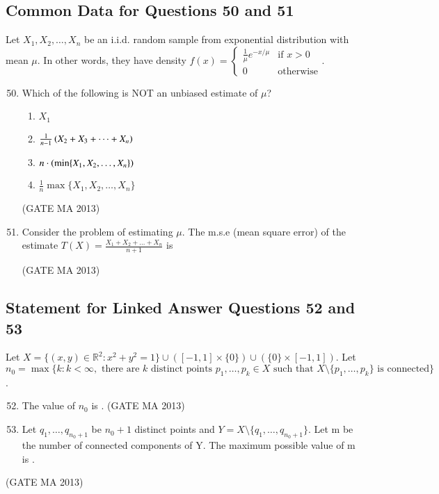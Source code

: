 \documentclass[journal,12pt,onecolumn]{IEEEtran}
\theoremstyle{remark}
\begin{document}
\subsection*{Common Data for Questions 50 and 51}
Let $X_1, X_2, \dots, X_n$ be an i.i.d. random sample from exponential distribution with mean $\mu$. In other words, they have density $f(x) = \begin{cases} \frac{1}{\mu} e^{-x/\mu} & \text{if } x>0 \\ 0 & \text{otherwise} \end{cases}$.
\begin{enumerate}
    \setcounter{enumi}{49}
    \item Which of the following is NOT an unbiased estimate of $\mu$?
    \begin{enumerate}
        \item $X_1$
        \item $\frac{1}{n-1}\left(X_2 + X_3 + \dots + X_n\right)$
        \item $n \cdot \left(\min\{X_1, X_2, \dots, X_n\}\right)$
        \item $\frac{1}{n} \max\{X_1, X_2, \dots, X_n\}$
    \end{enumerate}
    \hfill (GATE MA 2013)
    \item Consider the problem of estimating $\mu$. The m.s.e (mean square error) of the estimate $T(X) = \frac{X_1 + X_2 + \dots + X_n}{n+1}$ is
    \begin{enumerate}
    \end{enumerate}
    \hfill (GATE MA 2013)
\end{enumerate}
\subsection*{Statement for Linked Answer Questions 52 and 53}
Let $X = \{(x,y) \in \mathbb{R}^2 : x^2+y^2=1\} \cup ([-1,1] \times \{0\}) \cup (\{0\} \times [-1,1])$.
Let $n_0 = \max\{k : k < \infty, \text{ there are } k \text{ distinct points } p_1, \dots, p_k \in X \text{ such that } X \setminus \{p_1, \dots, p_k\} \text{ is connected}\}$.
\begin{enumerate}
    \setcounter{enumi}{51}
    \item The value of $n_0$ is \underline{\hspace{1cm}}.
    \hfill (GATE MA 2013)
    
    \item Let $q_1, \dots, q_{n_0+1}$ be $n_0+1$ distinct points and $Y = X \setminus \{q_1, \dots, q_{n_0+1}\}$. Let m be the number of connected components of Y. The maximum possible value of m is \underline{\hspace{1cm}}.
\end{enumerate}
\hfill (GATE MA 2013)
\end{document}
